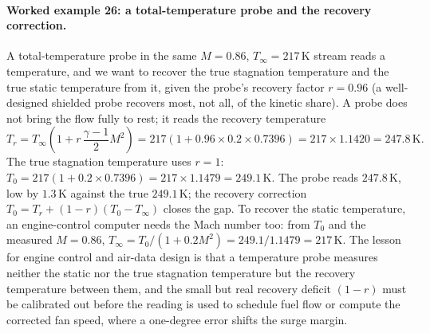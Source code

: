 \paragraph{Worked example 26: a total-temperature probe and the recovery
correction.} A total-temperature probe in the same $M = 0.86$,
$T_\infty = 217\,\si{\kelvin}$ stream reads a temperature, and we want to
recover the true stagnation temperature and the true static temperature
from it, given the probe's recovery factor $r = 0.96$ (a well-designed
shielded probe recovers most, not all, of the kinetic share). A probe
does not bring the flow fully to rest; it reads the recovery temperature
\[
T_r = T_\infty\left(1 + r\,\frac{\gamma - 1}{2}M^2\right)
= 217\left(1 + 0.96\times 0.2\times 0.7396\right)
= 217\times 1.1420 = 247.8\,\si{\kelvin}.
\]
The true stagnation temperature uses $r = 1$:
$T_0 = 217(1 + 0.2\times 0.7396) = 217\times 1.1479 =
249.1\,\si{\kelvin}$. The probe reads $247.8\,\si{\kelvin}$, low by
$1.3\,\si{\kelvin}$ against the true $249.1\,\si{\kelvin}$; the recovery
correction $T_0 = T_r + (1 - r)(T_0 - T_\infty)$ closes the gap. To
recover the static temperature, an engine-control computer needs the
Mach number too: from $T_0$ and the measured $M = 0.86$,
$T_\infty = T_0/(1 + 0.2 M^2) = 249.1/1.1479 = 217\,\si{\kelvin}$. The
lesson for engine control and air-data design is that a temperature
probe measures neither the static nor the true stagnation temperature
but the recovery temperature between them, and the small but real
recovery deficit $(1 - r)$ must be calibrated out before the reading is
used to schedule fuel flow or compute the corrected fan speed, where a
one-degree error shifts the surge margin.

